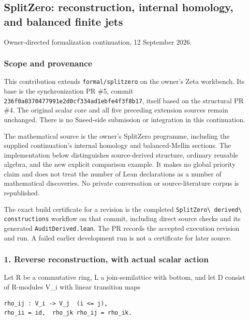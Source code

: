 \subsection{SplitZero: reconstruction, internal homology, and balanced finite
jets}\label{derived_main:splitzero-reconstruction-internal-homology-and-balanced-finite-jets}

Owner-directed formalization continuation, 12 September 2026.

\subsubsection{Scope and provenance}\label{derived_main:scope-and-provenance}

This contribution extends \nolinkurl{formal/splitzero} on the owner's Zeta workbench. Its base is the
synchronization PR \#5, commit \nolinkurl{236f0a8370477991e2d0cf334ad1ebfe4f3f8b17}, itself based on
the structural PR \#4. The original scalar core and all five preceding extension sources remain
unchanged. There is no Sneed-side submission or integration in this continuation.

The mathematical source is the owner's SplitZero programme, including the supplied continuation's
internal homology and balanced-Mellin sections. The implementation below distinguishes
source-derived structure, ordinary reusable algebra, and the new explicit comparison example. It
makes no global priority claim and does not treat the number of Lean declarations as a number of
mathematical discoveries. No private conversation or source-literature corpus is republished.

The exact build certificate for a revision is the completed
\nolinkurl{SplitZero\ derived\ constructions} workflow on that commit, including direct source checks
and its generated \nolinkurl{AuditDerived.lean}. The PR records the accepted execution revision and
run. A failed earlier development run is not a certificate for later source.

\subsubsection{1. Reverse reconstruction, with actual scalar
action}\label{derived_main:reverse-reconstruction-with-actual-scalar-action}

Let R be a commutative ring, L a join-semilattice with bottom, and let D consist of R-modules V\_i
with linear transition maps

\begin{verbatim}
rho_ij : V_i -> V_j  (i <= j),
rho_ii = id,  rho_jk rho_ij = rho_ik.
\end{verbatim}

